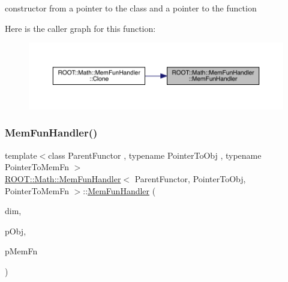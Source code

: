constructor from a pointer to the class and a pointer to the function 

Here is the caller graph for this function\+:\nopagebreak
\begin{figure}[H]
\begin{center}
\leavevmode
\includegraphics[width=350pt]{d6/d5f/classROOT_1_1Math_1_1MemFunHandler_a714877219c36aab344b3785be06affcc_icgraph}
\end{center}
\end{figure}
\mbox{\label{classROOT_1_1Math_1_1MemFunHandler_ae160c1f60f6681ba29ce9e2bf3654b24}} 
\subsubsection{\texorpdfstring{MemFunHandler()}{MemFunHandler()}\hspace{0.1cm}{\footnotesize\ttfamily [2/4]}}
{\footnotesize\ttfamily template$<$class Parent\+Functor , typename Pointer\+To\+Obj , typename Pointer\+To\+Mem\+Fn $>$ \\
\mbox{\hyperlink{classROOT_1_1Math_1_1MemFunHandler}{R\+O\+O\+T\+::\+Math\+::\+Mem\+Fun\+Handler}}$<$ Parent\+Functor, Pointer\+To\+Obj, Pointer\+To\+Mem\+Fn $>$\+::\mbox{\hyperlink{classROOT_1_1Math_1_1MemFunHandler}{Mem\+Fun\+Handler}} (\begin{DoxyParamCaption}\item[{unsigned int}]{dim,  }\item[{const Pointer\+To\+Obj \&}]{p\+Obj,  }\item[{Pointer\+To\+Mem\+Fn}]{p\+Mem\+Fn }\end{DoxyParamCaption})\hspace{0.3cm}{\ttfamily [inline]}}



